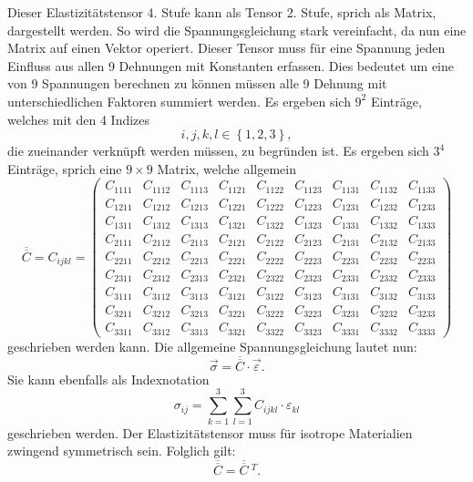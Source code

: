 Dieser Elastizitätstensor 4. Stufe kann als Tensor 2. Stufe, sprich als Matrix, dargestellt werden.
So wird die Spannungsgleichung stark vereinfacht, da nun eine Matrix auf einen Vektor operiert.
Dieser Tensor muss für eine Spannung jeden Einfluss aus allen 9 Dehnungen mit Konstanten erfassen.
Dies bedeutet um eine von 9 Spannungen berechnen zu können müssen alle 9 Dehnung mit unterschiedlichen Faktoren summiert werden.
Es ergeben sich $9^2$ Einträge, welches mit den 4 Indizes
\[
i, j, k, l\in\left\{1, 2, 3\right\}
,
\]
die zueinander verknüpft werden müssen, zu begründen ist.
Es ergeben sich $3^4$ Einträge, sprich eine $9\times9$ Matrix, welche allgemein
\[
\overline{\overline{C}}
=
C_{ijkl}
=
\begin{pmatrix}
C_{1111} & C_{1112} & C_{1113} & C_{1121} & C_{1122} & C_{1123} & C_{1131} & C_{1132} & C_{1133} \\
C_{1211} & C_{1212} & C_{1213} & C_{1221} & C_{1222} & C_{1223} & C_{1231} & C_{1232} & C_{1233} \\
C_{1311} & C_{1312} & C_{1313} & C_{1321} & C_{1322} & C_{1323} & C_{1331} & C_{1332} & C_{1333} \\
C_{2111} & C_{2112} & C_{2113} & C_{2121} & C_{2122} & C_{2123} & C_{2131} & C_{2132} & C_{2133} \\
C_{2211} & C_{2212} & C_{2213} & C_{2221} & C_{2222} & C_{2223} & C_{2231} & C_{2232} & C_{2233} \\
C_{2311} & C_{2312} & C_{2313} & C_{2321} & C_{2322} & C_{2323} & C_{2331} & C_{2332} & C_{2333} \\
C_{3111} & C_{3112} & C_{3113} & C_{3121} & C_{3122} & C_{3123} & C_{3131} & C_{3132} & C_{3133} \\
C_{3211} & C_{3212} & C_{3213} & C_{3221} & C_{3222} & C_{3223} & C_{3231} & C_{3232} & C_{3233} \\
C_{3311} & C_{3312} & C_{3313} & C_{3321} & C_{3322} & C_{3323} & C_{3331} & C_{3332} & C_{3333}
\end{pmatrix}
\]
geschrieben werden kann.
Die allgemeine Spannungsgleichung lautet nun:
\[
\vec\sigma
=
\overline{\overline{C}}\cdot\vec{\varepsilon}
.
\]
Sie kann ebenfalls als Indexnotation
\[
\sigma_{ij}
=
\sum_{k=1}^3
\sum_{l=1}^3
C_{ijkl}\cdot\varepsilon_{kl}
\]
geschrieben werden.
Der Elastizitätstensor muss für isotrope Materialien zwingend symmetrisch sein.
Folglich gilt:
\[
\overline{\overline{C}}
=
\overline{\overline{C}}~^{T}
.
\]


